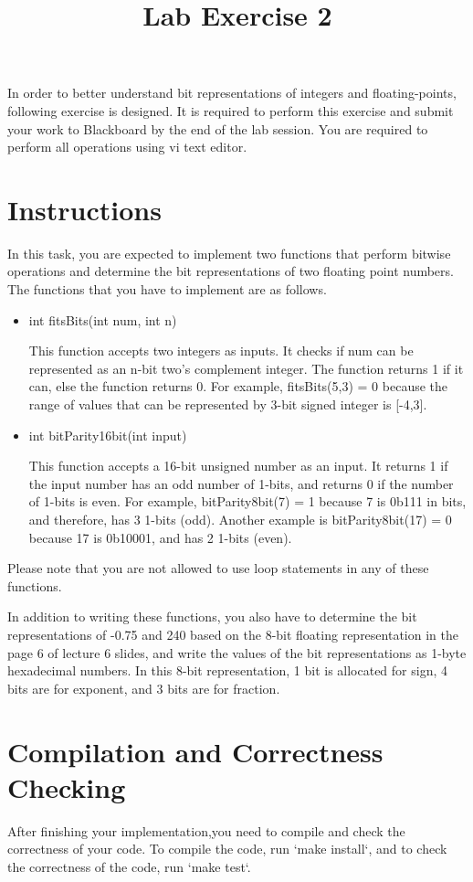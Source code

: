 \documentclass[twoside,11pt]{article}
\newcommand\assignmentNumber{2}
\begin{document}
    \title{Lab Exercise \assignmentNumber}
    \maketitle
In order to better understand bit representations of integers and floating-points, following exercise is designed. It is required to perform this exercise and submit your work to Blackboard by the end of the lab session. You are required to perform all operations using vi text editor.

\section{Instructions}

In this task, you are expected to implement two functions that perform bitwise operations and 
determine the bit representations of two floating point numbers. The functions that you have to 
implement are as follows.

\begin{itemize}
\item int fitsBits(int num, int n)

This function accepts two integers as inputs. It checks if num can be represented as an n-bit two's complement integer. The function returns 1 if it can, else the function returns 0. For example, fitsBits(5,3) = 0
because the range of values that can be represented by 3-bit signed integer is [-4,3].

\item int bitParity16bit(int input)

This function accepts a 16-bit unsigned number as an input. It returns 1 if the input number has 
an odd number of 1-bits, and returns 0 if the number of 1-bits is even. For example, 
bitParity8bit(7) = 1 because 7 is 0b111 in bits, and therefore, has 3 1-bits (odd). Another example
is bitParity8bit(17) = 0 because 17 is 0b10001, and has 2 1-bits (even).

\end{itemize}

Please note that you are not allowed to use loop statements in any of these functions. 

In addition to writing these functions, you also have to determine the bit representations of 
-0.75 and 240 based on the 8-bit floating representation in the page 6 of lecture 6 slides, 
and write the values of the bit representations as 1-byte hexadecimal numbers. In this 8-bit 
representation, 1 bit is allocated for sign, 4 bits are for exponent, and 3 bits are for fraction.

\section{Compilation and Correctness Checking}

After finishing your implementation,you need to compile and check the correctness of your code. To compile the code, run `make install`, and to check the correctness of the code, run `make test`.

\newpage
\end{document}
